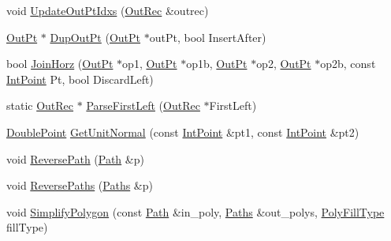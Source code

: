 \begin{DoxyCompactItemize}
\item 
void \mbox{\hyperlink{namespace_clipper_lib_a06a3e837b8fbaa3fc7e2640a8e4fe4a2}{Update\+Out\+Pt\+Idxs}} (\mbox{\hyperlink{struct_clipper_lib_1_1_out_rec}{Out\+Rec}} \&outrec)
\item 
\mbox{\hyperlink{struct_clipper_lib_1_1_out_pt}{Out\+Pt}} $\ast$ \mbox{\hyperlink{namespace_clipper_lib_aa1703e1ae9853c08c859b7b1230b5b00}{Dup\+Out\+Pt}} (\mbox{\hyperlink{struct_clipper_lib_1_1_out_pt}{Out\+Pt}} $\ast$out\+Pt, bool Insert\+After)
\item 
bool \mbox{\hyperlink{namespace_clipper_lib_acd026a4d43018ae65b8d253fbf44b680}{Join\+Horz}} (\mbox{\hyperlink{struct_clipper_lib_1_1_out_pt}{Out\+Pt}} $\ast$op1, \mbox{\hyperlink{struct_clipper_lib_1_1_out_pt}{Out\+Pt}} $\ast$op1b, \mbox{\hyperlink{struct_clipper_lib_1_1_out_pt}{Out\+Pt}} $\ast$op2, \mbox{\hyperlink{struct_clipper_lib_1_1_out_pt}{Out\+Pt}} $\ast$op2b, const \mbox{\hyperlink{struct_clipper_lib_1_1_int_point}{Int\+Point}} Pt, bool Discard\+Left)
\item 
static \mbox{\hyperlink{struct_clipper_lib_1_1_out_rec}{Out\+Rec}} $\ast$ \mbox{\hyperlink{namespace_clipper_lib_ab4671015e7694c784513f3d3ea4405ce}{Parse\+First\+Left}} (\mbox{\hyperlink{struct_clipper_lib_1_1_out_rec}{Out\+Rec}} $\ast$First\+Left)
\item 
\mbox{\hyperlink{struct_clipper_lib_1_1_double_point}{Double\+Point}} \mbox{\hyperlink{namespace_clipper_lib_a5a62f42148b8b9991da9cfe8cb9cb065}{Get\+Unit\+Normal}} (const \mbox{\hyperlink{struct_clipper_lib_1_1_int_point}{Int\+Point}} \&pt1, const \mbox{\hyperlink{struct_clipper_lib_1_1_int_point}{Int\+Point}} \&pt2)
\item 
void \mbox{\hyperlink{namespace_clipper_lib_ab6376320953c60093dc73462c74589e1}{Reverse\+Path}} (\mbox{\hyperlink{namespace_clipper_lib_af39c8fe00f278f18cc8142fef41242da}{Path}} \&p)
\item 
void \mbox{\hyperlink{namespace_clipper_lib_ade103cad7caf2aa357b2d5410866ea62}{Reverse\+Paths}} (\mbox{\hyperlink{namespace_clipper_lib_a4bab1d9e10805fa6f1fd3b78c56efcfe}{Paths}} \&p)
\item 
void \mbox{\hyperlink{namespace_clipper_lib_af374cea59a991e49f36c3530efc45feb}{Simplify\+Polygon}} (const \mbox{\hyperlink{namespace_clipper_lib_af39c8fe00f278f18cc8142fef41242da}{Path}} \&in\+\_\+poly, \mbox{\hyperlink{namespace_clipper_lib_a4bab1d9e10805fa6f1fd3b78c56efcfe}{Paths}} \&out\+\_\+polys, \mbox{\hyperlink{namespace_clipper_lib_a95a41ff8fa6b351d304829c267d638d7}{Poly\+Fill\+Type}} fill\+Type)

\end{DoxyCompactItemize}
